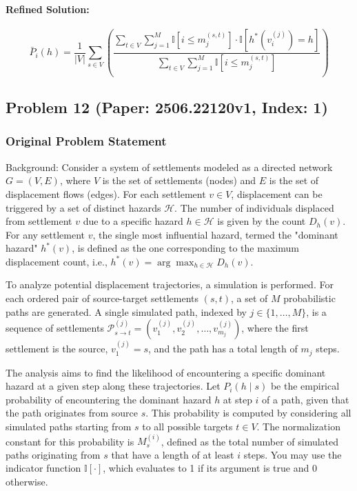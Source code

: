 \documentclass[10pt]{article}
\begin{document}
\paragraph*{Refined Solution:}
\[ \bar{P}_i(h) = \frac{1}{|V|} \sum_{s \in V} \left( \frac{\sum\limits_{t \in V} \sum\limits_{j=1}^{M} \mathbb{I}[i \leq m^{(s,t)}_j] \cdot \mathbb{I}[h^*(v^{(j)}_i) = h]}{\sum\limits_{t \in V} \sum\limits_{j=1}^{M} \mathbb{I}[i \leq m^{(s,t)}_j]} \right) \]

\newpage
\subsection*{Problem 12 (Paper: 2506.22120v1, Index: 1)}

\subsubsection*{Original Problem Statement}
Background:
Consider a system of settlements modeled as a directed network $G=(V,E)$, where $V$ is the set of settlements (nodes) and $E$ is the set of displacement flows (edges). For each settlement $v \in V$, displacement can be triggered by a set of distinct hazards $\mathcal{H}$. The number of individuals displaced from settlement $v$ due to a specific hazard $h \in \mathcal{H}$ is given by the count $D_h(v)$. For any settlement $v$, the single most influential hazard, termed the "dominant hazard" $h^*(v)$, is defined as the one corresponding to the maximum displacement count, i.e., $h^*(v) = \arg\max_{h \in \mathcal{H}} D_h(v)$.

To analyze potential displacement trajectories, a simulation is performed. For each ordered pair of source-target settlements $(s, t)$, a set of $M$ probabilistic paths are generated. A single simulated path, indexed by $j \in \{1, \dots, M\}$, is a sequence of settlements $\mathcal{P}^{(j)}_{s \to t} = (v^{(j)}_1, v^{(j)}_2, \dots, v^{(j)}_{m_j})$, where the first settlement is the source, $v^{(j)}_1 = s$, and the path has a total length of $m_j$ steps.

The analysis aims to find the likelihood of encountering a specific dominant hazard at a given step along these trajectories. Let $P_i(h \mid s)$ be the empirical probability of encountering the dominant hazard $h$ at step $i$ of a path, given that the path originates from source $s$. This probability is computed by considering all simulated paths starting from $s$ to all possible targets $t \in V$. The normalization constant for this probability is $M_s^{(i)}$, defined as the total number of simulated paths originating from $s$ that have a length of at least $i$ steps. You may use the indicator function $\mathbb{I}[\cdot]$, which evaluates to 1 if its argument is true and 0 otherwise.
\end{document}
